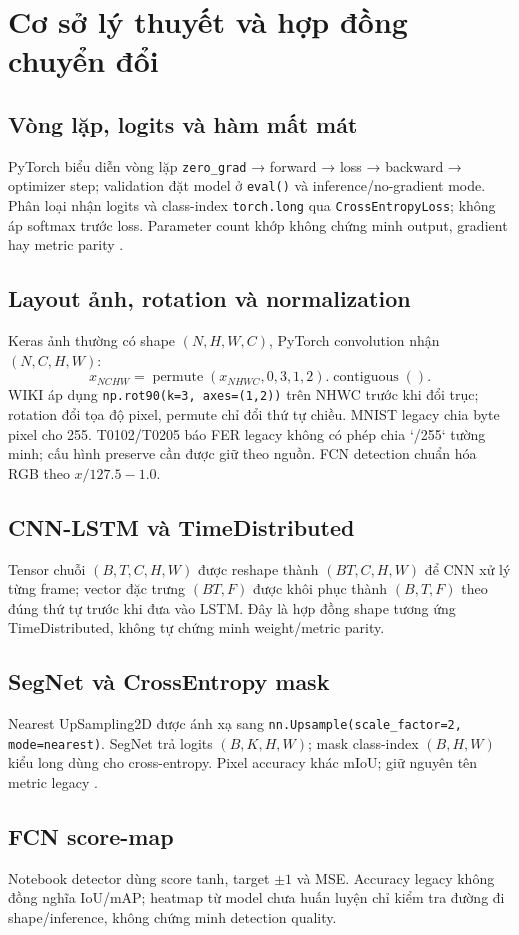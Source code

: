 \chapter{Cơ sở lý thuyết và hợp đồng chuyển đổi}
\section{Vòng lặp, logits và hàm mất mát}
PyTorch biểu diễn vòng lặp \texttt{zero\_grad} → forward → loss → backward → optimizer step; validation đặt model ở \texttt{eval()} và inference/no-gradient mode. Phân loại nhận logits và class-index \texttt{torch.long} qua \texttt{CrossEntropyLoss}; không áp softmax trước loss. Parameter count khớp không chứng minh output, gradient hay metric parity \cite{paszke2019pytorch}.

\section{Layout ảnh, rotation và normalization}
Keras ảnh thường có shape $(N,H,W,C)$, PyTorch convolution nhận $(N,C,H,W)$:
\[
x_{NCHW}=\operatorname{permute}(x_{NHWC},0,3,1,2).\operatorname{contiguous}().
\]
WIKI áp dụng \texttt{np.rot90(k=3, axes=(1,2))} trên NHWC trước khi đổi trục; rotation đổi tọa độ pixel, permute chỉ đổi thứ tự chiều. MNIST legacy chia byte pixel cho 255. T0102/T0205 báo FER legacy không có phép chia `/255` tường minh; cấu hình preserve cần được giữ theo nguồn. FCN detection chuẩn hóa RGB theo $x/127.5-1.0$.

\section{CNN-LSTM và TimeDistributed}
Tensor chuỗi $(B,T,C,H,W)$ được reshape thành $(BT,C,H,W)$ để CNN xử lý từng frame; vector đặc trưng $(BT,F)$ được khôi phục thành $(B,T,F)$ theo đúng thứ tự trước khi đưa vào LSTM. Đây là hợp đồng shape tương ứng TimeDistributed, không tự chứng minh weight/metric parity.

\section{SegNet và CrossEntropy mask}
Nearest UpSampling2D được ánh xạ sang \texttt{nn.Upsample(scale\_factor=2, mode=nearest)}. SegNet trả logits $(B,K,H,W)$; mask class-index $(B,H,W)$ kiểu long dùng cho cross-entropy. Pixel accuracy khác mIoU; giữ nguyên tên metric legacy \cite{badrinarayanan2017segnet}.

\section{FCN score-map}
Notebook detector dùng score tanh, target $\pm1$ và MSE. Accuracy legacy không đồng nghĩa IoU/mAP; heatmap từ model chưa huấn luyện chỉ kiểm tra đường đi shape/inference, không chứng minh detection quality.